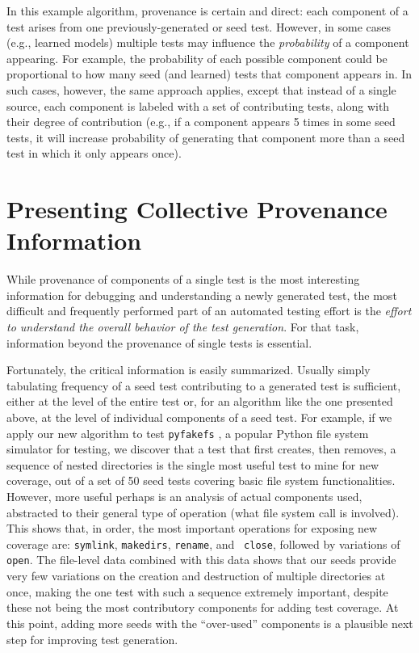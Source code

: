 \documentclass[final]{article}
\begin{document}
In this example algorithm, provenance is certain and direct:  each component of a
test arises from one previously-generated or seed test.  However, in
some cases (e.g., learned models) multiple tests may influence the
\emph{probability} of a component appearing.  For example, the
probability of each possible component could be proportional to how
many seed (and learned) tests that component appears in.  In such cases,
however, the same approach applies, except that instead of a single
source, each component is labeled with a set of contributing tests,
along with their degree of contribution (e.g., if a component appears
5 times in some seed tests, it will increase probability of generating
that component more than a seed test in which it only appears once).

\section{Presenting Collective Provenance Information}

While provenance of components of a single test is the most
interesting information for debugging and understanding a newly
generated test, the most difficult and frequently performed part of an
automated testing effort is the \emph{effort to understand the overall
behavior of the test generation}.  For that task, information beyond
the provenance of single tests is essential.

Fortunately, the critical information is easily summarized.  Usually
simply tabulating frequency of a seed test contributing to a generated
test is sufficient, either at the level of the entire test or, for an
algorithm like the one presented above, at the level of individual
components of a seed test.  For example, if we apply our new algorithm
to test {\tt pyfakefs} \cite{pyfakefs}, a popular Python file system
simulator for testing, we discover that a test that first creates,
then removes, a sequence of nested directories is the single most
useful test to mine for new coverage, out of a set of 50 seed tests
covering basic file system functionalities.  However, more useful
perhaps is an analysis of actual components used, abstracted to their
general type of operation (what file system call is involved).  This
shows that, in order, the most important operations for exposing new
coverage are:  {\tt symlink}, {\tt makedirs}, {\tt rename}, and {\tt
  close}, followed by variations of {\tt open}.  The file-level data
combined with this data shows that our seeds provide very few
variations on the creation and destruction of multiple directories at
once, making the one test with such a sequence extremely important,
despite these not being the most contributory components for adding
test coverage.  At this point, adding more seeds with the
``over-used'' components is a plausible next step for improving test
generation.
\end{document}
